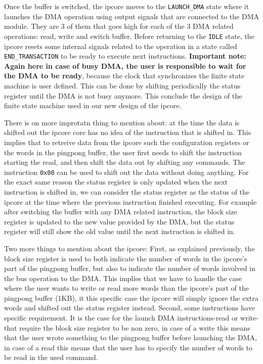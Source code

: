\documentclass[a4paper,11pt,oneside]{report}
\begin{document}
Once the buffer is switched, the ipcore moves to the \texttt{LAUNCH\_DMA} state where it launches the DMA operation using output signals that are connected to the DMA module. 
They are 3 of them that goes high for each of the 3 DMA related operations: read, write and switch buffer.
Before returning to the \texttt{IDLE} state, the ipcore resets some internal signals related to the operation in a state called \texttt{END\_TRANSACTION} to be ready to execute next instructions.
\textbf{Important note: Again here in case of busy DMA, the user is responsible to wait for the DMA to be ready}, because the clock that synchronizes the finite state machine is user defined.
This can be done by shifting periodically the status register until the DMA is not busy anymore.
This conclude the design of the finite state machine used in our new design of the ipcore.

There is on more improtatn thing to mention about: at the time the data is shifted out the ipcore core has no idea of the instruction that is shifted in. This implies
that to retreive data from the ipcore such the configuration registers or the words in the pingpong buffer, the user first needs to shift the instruction starting the read,
and then shift the data out by shifting any commands. The instruction \texttt{0x00} can be used to shift out the data without doing anything. 
For the exact same reason the status register is only updated when the next instruction is shifted in, we can consider the status register as the status of the ipcore at the time where
the previous instruction finished executing. For example after switching the buffer with any DMA related instruction, the block size register is 
updated to the new value provided by the DMA, but the status register will still show the old value until the next instruction is shifted in.

Two more things to mention about the ipcore:
First, as explained previously, the block size register is used to both indicate the number of words in the ipcore's part of the pingpong buffer, but also to indicate the number of words involved in the bus operation to the DMA.
This implies that we have to handle the case where the user wants to write or read more words than the ipcore's part of the pingpong buffer (1KB), 
it this specific case the ipcore will simply ignore the extra words and shifted out the status register instead. 
Second, some instructions have specific requirement. It is the case for the launch DMA instructions-read or write- that require the 
block size register to be non zero, in case of a write this means that the user wrote something to the pingpong buffer before launching the DMA, in case of a read this means
that the user has to specify the number of words to be read in the used command. 
\end{document}
